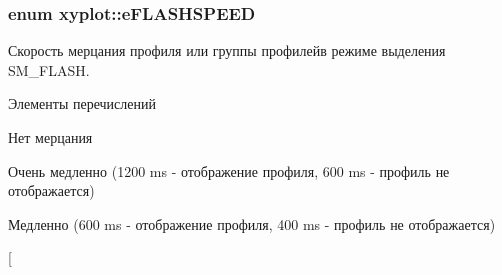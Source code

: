 \hypertarget{namespacexyplot_a1bac9f7a6de6b692c81e81ca9610190a}{
\subsubsection[{e\-F\-L\-A\-S\-H\-S\-P\-E\-E\-D}]{\setlength{\rightskip}{0pt plus 5cm}enum {\bf xyplot\-::e\-F\-L\-A\-S\-H\-S\-P\-E\-E\-D}}}\label{namespacexyplot_a1bac9f7a6de6b692c81e81ca9610190a}


Скорость мерцания профиля или группы профилейв режиме выделения S\-M\-\_\-\-F\-L\-A\-S\-H. 

\begin{Desc}
\item[Элементы перечислений]\par
\begin{description}
\item[{\em 
\hypertarget{namespacexyplot_a1bac9f7a6de6b692c81e81ca9610190aadd388bde41f9c3d8a30a3b94e3aa5db5}{F\-L\-S\-\_\-\-N\-O\-\_\-\-F\-L\-A\-S\-H}\label{namespacexyplot_a1bac9f7a6de6b692c81e81ca9610190aadd388bde41f9c3d8a30a3b94e3aa5db5}
}]Нет мерцания \item[{\em 
\hypertarget{namespacexyplot_a1bac9f7a6de6b692c81e81ca9610190aa55da24413f65c7df4ece0966310f58d3}{F\-L\-S\-\_\-\-V\-E\-R\-Y\-\_\-\-S\-L\-O\-W}\label{namespacexyplot_a1bac9f7a6de6b692c81e81ca9610190aa55da24413f65c7df4ece0966310f58d3}
}]Очень медленно (1200 ms -\/ отображение профиля, 600 ms -\/ профиль не отображается) \item[{\em 
\hypertarget{namespacexyplot_a1bac9f7a6de6b692c81e81ca9610190aaad74faeaff8f6cee91701b0598b2e1c4}{F\-L\-S\-\_\-\-S\-L\-O\-W}\label{namespacexyplot_a1bac9f7a6de6b692c81e81ca9610190aaad74faeaff8f6cee91701b0598b2e1c4}
}]Медленно (600 ms -\/ отображение профиля, 400 ms -\/ профиль не отображается) \item[{\em 
}
\end{description}
\end{Desc}
